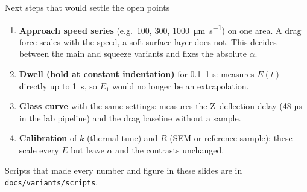 \documentclass[aspectratio=169,9pt]{beamer}
\begin{document}
\begin{frame}{Next steps that would settle the open points}
\small
\begin{enumerate}
\item \textbf{Approach speed series} (e.g.\ 100, 300, \SI{1000}{\micro\metre\per\second}) on one area. A drag force scales with the speed, a soft surface layer does not. This decides between the main and squeeze variants and fixes the absolute $\alpha$.
\item \textbf{Dwell (hold at constant indentation)} for 0.1--1 s: measures $E(t)$ directly up to \SI{1}{\second}, so $E_1$ would no longer be an extrapolation.
\item \textbf{Glass curve} with the same settings: measures the Z--deflection delay (48 µs in the lab pipeline) and the drag baseline without a sample.
\item \textbf{Calibration} of $k$ (thermal tune) and $R$ (SEM or reference sample): these scale every $E$ but leave $\alpha$ and the contrasts unchanged.
\end{enumerate}
\vspace{6pt}
Scripts that made every number and figure in these slides are in \texttt{docs/variants/scripts}.
\end{frame}
\end{document}
